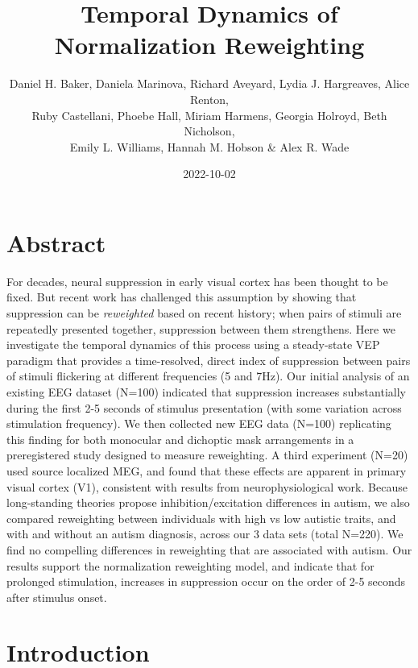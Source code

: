 \documentclass[
]{article}
\title{Temporal Dynamics of Normalization Reweighting}
\author{Daniel H. Baker, Daniela Marinova, Richard Aveyard, Lydia J. Hargreaves, Alice Renton,\\
Ruby Castellani, Phoebe Hall, Miriam Harmens, Georgia Holroyd, Beth Nicholson,\\
Emily L. Williams, Hannah M. Hobson \& Alex R. Wade}
\date{2022-10-02}
\begin{document}
\maketitle

\hypertarget{abstract}{%
\section{Abstract}\label{abstract}}

For decades, neural suppression in early visual cortex has been thought to be fixed. But recent work has challenged this assumption by showing that suppression can be \emph{reweighted} based on recent history; when pairs of stimuli are repeatedly presented together, suppression between them strengthens. Here we investigate the temporal dynamics of this process using a steady-state VEP paradigm that provides a time-resolved, direct index of suppression between pairs of stimuli flickering at different frequencies (5 and 7Hz). Our initial analysis of an existing EEG dataset (N=100) indicated that suppression increases substantially during the first 2-5 seconds of stimulus presentation (with some variation across stimulation frequency). We then collected new EEG data (N=100) replicating this finding for both monocular and dichoptic mask arrangements in a preregistered study designed to measure reweighting. A third experiment (N=20) used source localized MEG, and found that these effects are apparent in primary visual cortex (V1), consistent with results from neurophysiological work. Because long-standing theories propose inhibition/excitation differences in autism, we also compared reweighting between individuals with high vs low autistic traits, and with and without an autism diagnosis, across our 3 data sets (total N=220). We find no compelling differences in reweighting that are associated with autism. Our results support the normalization reweighting model, and indicate that for prolonged stimulation, increases in suppression occur on the order of 2-5 seconds after stimulus onset.

\hypertarget{introduction}{%
\section{Introduction}\label{introduction}}
\end{document}
